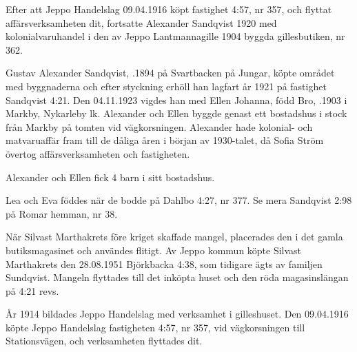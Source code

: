 Efter att Jeppo Handelslag 09.04.1916 köpt fastighet 4:57, nr	357, och flyttat affärsverksamheten dit, fortsatte Alexander Sandqvist	1920 med kolonialvaruhandel i den av Jeppo Lantmannagille 1904 byggda gillesbutiken, nr 362.


Gustav Alexander Sandqvist, .1894 på Svartbacken på Jungar, köpte området med byggnaderna och efter styckning	erhöll han lagfart år 1921 på fastighet Sandqvist 4:21. Den 04.11.1923 vigdes han med Ellen Johanna, född Bro, .1903 i Markby, Nykarleby lk. Alexander och Ellen byggde genast ett bostadshus i stock från Markby på tomten vid vägkorsningen. Alexander hade kolonial- och matvaruaffär fram till de dåliga åren i början av 1930-talet, då Sofia Ström övertog affärsverksamheten och fastigheten.

Alexander och Ellen fick 4 barn i sitt bostadshus.
\begin{jhchildren}
  \item {}
  \item {}
  \item {}
  \item {}
\end{jhchildren}
Lea och Eva föddes när de bodde på Dahlbo 4:27, nr 377. Se mera Sandqvist 2:98 på Romar hemman, nr 38.

När Silvast Marthakrets före kriget skaffade mangel, placerades den i det gamla butiksmagasinet och användes flitigt. Av Jeppo kommun köpte Silvast Marthakrets den 28.08.1951 Björkbacka 4:38, som tidigare ägts av familjen Sundqvist. Mangeln flyttades till det inköpta huset och den röda magasinslängan på 4:21 revs.


År 1914 bildades Jeppo Handelslag med verksamhet i gilleshuset. Den 09.04.1916 köpte Jeppo Handelslag fastigheten 4:57, nr 357, vid vägkorsningen till Stationsvägen, och verksamheten flyttades dit.


